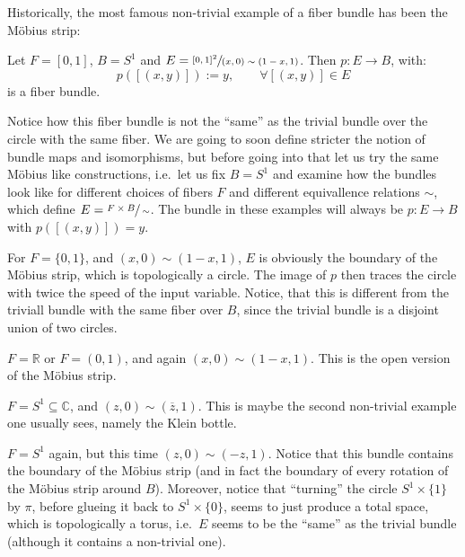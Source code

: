 Historically, the most famous non-trivial example of a fiber bundle has been the M\"obius strip:
\begin{example} Let $F=[0,1]$, $B=S^1$ and $E=\sfrac{{[0,1]}^2}{(x,0)\sim(1-x,1)}$. Then $p:E\to B$, with:
\[p([(x,y)]):= y,\qquad\forall [(x,y)]\in E\]
is a fiber bundle.
\end{example}
Notice how this fiber bundle is not the ``same'' as the trivial bundle over the circle with the same fiber. We are going to soon define stricter the notion of bundle maps and isomorphisms, but before going into that let us try the same M\"obius like constructions, i.e.\ let us fix $B=S^1$ and examine how the bundles look like for different choices of fibers $F$ and different equivallence relations $\sim$, which define $E=\sfrac{F\times B}{\sim}$. The bundle in these examples will always be $p:E\to B$ with $p([(x,y)])=y$.

\begin{examples}
\begin{i_enum}
\item For $F=\{0,1\}$, and $(x,0)\sim(1-x,1)$, $E$ is obviously the boundary of the M\"obius strip, which is topologically a circle. The image of $p$ then traces the circle with twice the speed of the input variable. Notice, that this is different from the triviall bundle with the same fiber over $B$, since the trivial bundle is a disjoint union of two circles.
\item $F=\mathbb{R}$ or $F=(0,1)$, and again $(x,0)\sim(1-x,1)$. This is the open version of the M\"obius strip.
\item $F=S^1\subseteq\mathbb{C}$, and $(z,0)\sim(\overline{z},1)$. This is maybe the second non-trivial example one usually sees, namely the Klein bottle.
\item $F=S^1$ again, but this time $(z,0)\sim(-z,1)$. Notice that this bundle contains the boundary of the M\"obius strip (and in fact the boundary of every rotation of the M\"obius strip around $B$). Moreover, notice that ``turning'' the circle $S^1\times\{1\}$ by $\pi$, before glueing it back to $S^1\times\{0\}$, seems to just produce a total space, which is topologically a torus, i.e.\ $E$ seems to be the ``same'' as the trivial bundle (although it contains a non-trivial one).
\end{i_enum}
\end{examples}

